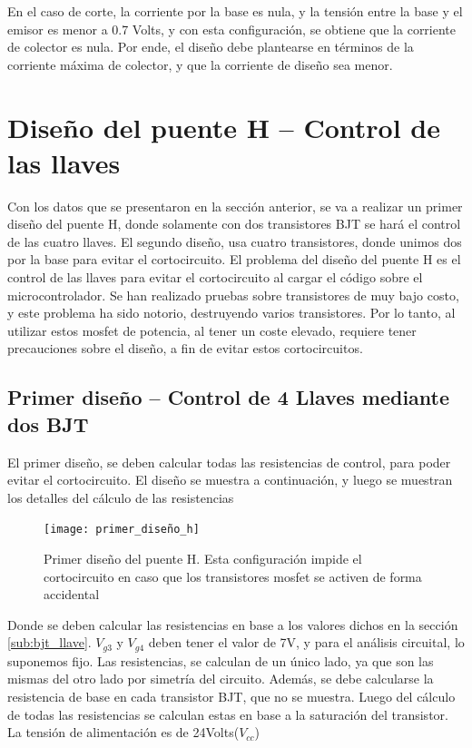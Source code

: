 En el caso de corte, la corriente por la base es nula, y la tensión entre la base y el emisor es menor a 0.7 Volts, y con esta configuración, se obtiene que la corriente de colector es nula. Por ende, el diseño debe plantearse en términos de la corriente máxima de colector, y que la corriente de diseño sea menor. 

\section{Diseño del puente H – Control de las llaves }

Con los datos que se presentaron en la sección anterior, se va a realizar un primer diseño del puente H, donde solamente con dos transistores BJT se hará el control de las cuatro llaves. El segundo diseño, usa cuatro transistores, donde unimos dos por la base para evitar el cortocircuito. El problema del diseño del puente H es el control de las llaves para evitar el cortocircuito al cargar el código sobre el microcontrolador. Se han realizado pruebas sobre transistores de muy bajo costo, y este problema ha sido notorio, destruyendo varios transistores. Por lo tanto, al utilizar estos mosfet de potencia, al tener un coste elevado, requiere tener precauciones sobre el diseño, a fin de evitar estos cortocircuitos. 

\subsection{Primer diseño – Control de 4 Llaves mediante dos BJT }

El primer diseño, se deben calcular todas las resistencias de control, para poder evitar el cortocircuito. El diseño se muestra a continuación, y luego se muestran los detalles del cálculo de las resistencias

\begin{figure}[ht!]
	\centering
	\texttt{[image: primer\_diseño\_h]}
	\caption{Primer diseño del puente H. Esta configuración impide el cortocircuito en caso que los transistores mosfet se activen de forma accidental}
	\label{fig:primer_puente_h}
\end{figure}

Donde se deben calcular las resistencias en base a los valores dichos en la sección \ref{sub:bjt_llave}. $V_{g3}$ y $V_{g4}$ deben tener el valor de 7V, y para el análisis circuital, lo suponemos fijo. Las resistencias, se calculan de un único lado, ya que son las mismas del otro lado por simetría del circuito. Además, se debe calcularse la resistencia de base en cada transistor BJT, que no se muestra. Luego del cálculo de todas las resistencias se calculan estas en base a la saturación del transistor. La tensión de alimentación es de 24Volts($V_{cc}$)

